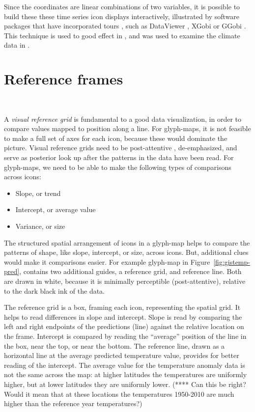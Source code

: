 \documentclass[oneside]{article}
\begin{document}
Since the coordinates are linear combinations of two variables, it is possible to build these these time series icon displays interactively, illustrated by software packages that have incorporated tours \citep{cook:2006}, such as DataViewer \citep{buja:1986}, XGobi \citep{swayne:1991} or GGobi \citep{swayne:2003}.  This technique is used to good effect in \citet{buja:1996a}, and was used to examine the climate data in \citet{hobbs:2010}.

\section{Reference frames}~\label{sec:reference}

A \emph{visual reference grid} \citep{cleveland:1993a} is fundamental
to a good data visualization, in order to compare values mapped to
position along a line. For glyph-maps, it is not feasible to make a
full set of axes for each icon, because these would dominate the
picture. Visual reference grids need to be post-attentive
\citep{healey}, de-emphasized, and serve as posterior look up after
the patterns in the data have been read. For glyph-maps, we need to be
able to make the following types of comparisons across icons:

\begin{itemize} \itemsep 0in
\item Slope, or trend
\item Intercept, or average value
\item Variance, or size
\end{itemize}

The structured spatial arrangement of icons in a glyph-map helps to compare the patterns of shape, like slope, intercept, or size, across icons. But, additional clues would make it comparisons easier. For example glyph-map in Figure~\ref{fig:gistemp-pred}, contains two additional guides, a reference grid, and reference line. Both are drawn in white, because it is minimally perceptible (post-attentive), relative to the dark black ink of the data.

The reference grid is a box, framing each icon, representing the spatial grid. It helps to read differences in slope and intercept. Slope is read by comparing the left and right endpoints of the predictions (line) against the relative location on the frame. Intercept is compared by reading the ``average'' position of the line in the box, near the top, or near the bottom. The reference line, drawn as a horizontal line at the average predicted temperature value, provides for better reading of the intercept. The average value for the temperature anomaly data is not the same across the map: at higher latitudes the temperatures are uniformly higher, but at lower latitudes they are uniformly lower. (**** Can this be right? Would it mean that at these locations the temperatures 1950-2010 are much higher than the reference year temperatures?)
\end{document}
